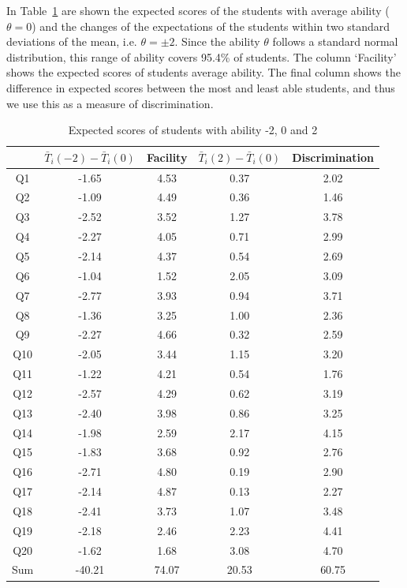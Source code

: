 \documentclass[a4paper]{report}
\begin{document}
In Table~\ref{tab:IRT_pre17_expscore} are shown the expected scores of the students with average ability ($\theta=0$) and the changes of the expectations of the students within two standard deviations of the mean, i.e. $\theta = \pm 2$. Since the ability $\theta$ follows a standard normal distribution, this range of ability covers 95.4\% of students. The column `Facility' shows the expected scores of students average ability. The final column shows the difference in expected scores between the most and least able students, and thus we use this as a measure of discrimination. 

\begin{table}[H]
  \centering
  \begin{tabular}{ccccc}
    \hline
   & $\bar T_i (-2) - \bar T_i (0)$ & Facility & $\bar T_i (2) - \bar T_i (0)$ & Discrimination\\ 
   \hline
  Q1 & -1.65 & 4.53 & 0.37 & 2.02 \\ 
    Q2 & -1.09 & 4.49 & 0.36 & 1.46 \\ 
    Q3 & -2.52 & 3.52 & 1.27 & 3.78 \\ 
    Q4 & -2.27 & 4.05 & 0.71 & 2.99 \\ 
    Q5 & -2.14 & 4.37 & 0.54 & 2.69 \\ 
    Q6 & -1.04 & 1.52 & 2.05 & 3.09 \\ 
    Q7 & -2.77 & 3.93 & 0.94 & 3.71 \\ 
    Q8 & -1.36 & 3.25 & 1.00 & 2.36 \\ 
    Q9 & -2.27 & 4.66 & 0.32 & 2.59 \\ 
    Q10 & -2.05 & 3.44 & 1.15 & 3.20 \\ 
    Q11 & -1.22 & 4.21 & 0.54 & 1.76 \\ 
    Q12 & -2.57 & 4.29 & 0.62 & 3.19 \\ 
    Q13 & -2.40 & 3.98 & 0.86 & 3.25 \\ 
    Q14 & -1.98 & 2.59 & 2.17 & 4.15 \\ 
    Q15 & -1.83 & 3.68 & 0.92 & 2.76 \\ 
    Q16 & -2.71 & 4.80 & 0.19 & 2.90 \\ 
    Q17 & -2.14 & 4.87 & 0.13 & 2.27 \\ 
    Q18 & -2.41 & 3.73 & 1.07 & 3.48 \\ 
    Q19 & -2.18 & 2.46 & 2.23 & 4.41 \\ 
    Q20 & -1.62 & 1.68 & 3.08 & 4.70 \\ 
    \hline
    Sum & -40.21 & 74.07 & 20.53 & 60.75 \\ 
     \hline
  \end{tabular}
  \caption{\label{tab:IRT_pre17_expscore}Expected scores of students with ability -2, 0 and 2}
\end{table}
\end{document}

